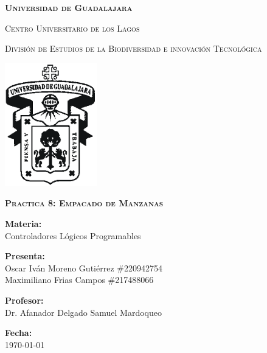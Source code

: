 \documentclass[12pt]{report}
\begin{document}
\setlength{\hoffset}{27 pt} %
\begin{titlepage}
{\centering
{\scshape\bfseries\fontsize{29.16}{34.992}\selectfont Universidad de Guadalajara \par}
\vspace{0.5cm}
{\scshape\Large Centro Universitario de los Lagos \par}
\vspace{1cm}
{\scshape\Large División de Estudios de la Biodiversidad e innovación Tecnológica \par}
\vspace{1cm}
{\graphicspath{{imagenes/Portada}} %
\includegraphics[width=0.3\textwidth]{image.png}\par}
\vspace{1cm}
{\scshape\large\bfseries Practica 8: Empacado de Manzanas\par}
\vspace{0.5cm}
{\large \textbf{Materia:} \\Controladores Lógicos Programables\par}
\vfill
{\large \textbf{Presenta:} \\Oscar Iván Moreno Gutiérrez \#220942754
\\Maximiliano Frias Campos \#217488066
\par}
\vfill
{\large \textbf{Profesor:} \\Dr. Afanador Delgado Samuel Mardoqueo \par}
\vfill
\vfill
\begin{flushright}
  {\normalsize \textbf {Fecha:} \\ \today}
\end{flushright}
\vfill}
{\large  \par}
\end{titlepage}
\end{document}
